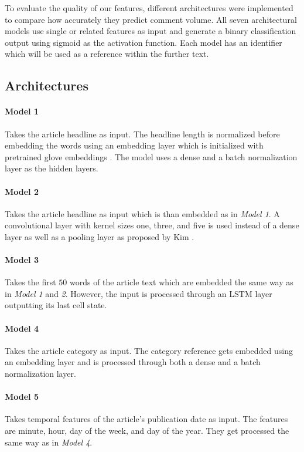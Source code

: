 To evaluate the quality of our features, different architectures were implemented to compare how accurately they predict comment volume.
All seven architectural models use single or related features as input and generate a binary classification output using sigmoid as the activation function. 
Each model has an identifier which will be used as a reference within the further text.

\subsection{Architectures}

\paragraph{Model 1} 
Takes the article headline as input.
The headline length is normalized before embedding the words using an embedding layer which is initialized with pretrained glove embeddings \cite{pennington2014glove}.
The model uses a dense and a batch normalization layer as the hidden layers.

\paragraph{Model 2}
Takes the article headline as input which is than embedded as in \textit{Model 1}. 
A convolutional layer with kernel sizes one, three, and five is used instead of a dense layer as well as a pooling layer as proposed by Kim \cite{kim2014convolutional}.

\paragraph{Model 3} 
Takes the first $50$ words of the article text which are embedded the same way as in \textit{Model 1} and \textit{2}. However, the input is processed through an LSTM layer outputting its last cell state.

\paragraph{Model 4} 
Takes the article category as input.
The category reference gets embedded using an embedding layer and is processed through both a dense and a batch normalization layer.

\paragraph{Model 5} 
Takes temporal features of the article's publication date as input.
The features are minute, hour, day of the week, and day of the year.
They get processed the same way as in \textit{Model 4}.

